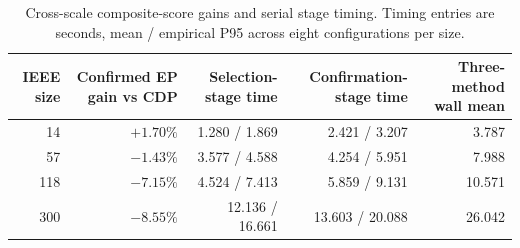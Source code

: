\begin{table}[!htbp]
\centering\small
\caption{Cross-scale composite-score gains and serial stage timing. Timing entries are seconds, mean / empirical P95 across eight configurations per size.}
\label{tab:scale_timing}
\begin{tabular}{rrrrr}
\toprule
IEEE size & Confirmed EP gain vs CDP & Selection-stage time & Confirmation-stage time & Three-method wall mean\\
\midrule
14 & $+1.70\%$ & 1.280 / 1.869 & 2.421 / 3.207 & 3.787\\
57 & $-1.43\%$ & 3.577 / 4.588 & 4.254 / 5.951 & 7.988\\
118 & $-7.15\%$ & 4.524 / 7.413 & 5.859 / 9.131 & 10.571\\
300 & $-8.55\%$ & 12.136 / 16.661 & 13.603 / 20.088 & 26.042\\
\bottomrule
\end{tabular}
\end{table}

